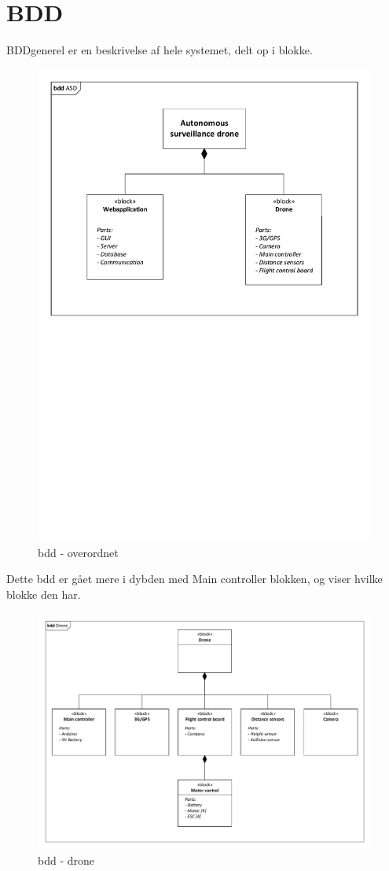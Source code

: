 \section{BDD}

BDD\textunderscore generel er en beskrivelse af hele systemet, delt op i blokke.


\begin{figure}[H]
\centering
\includegraphics[width=1\textwidth]{Billeder/BDD/bdd_overordnet.pdf}
\caption{bdd - overordnet}
\label{fig:bdd_overordnet}
\end{figure}

Dette bdd er gået mere i dybden med Main controller blokken, og viser hvilke blokke den har.

\begin{figure}[H]
\centering
\includegraphics[width=1\textwidth]{Billeder/BDD/bdd_drone.pdf}
\caption{bdd - drone}
\label{fig:bdd_drone}
\end{figure}
